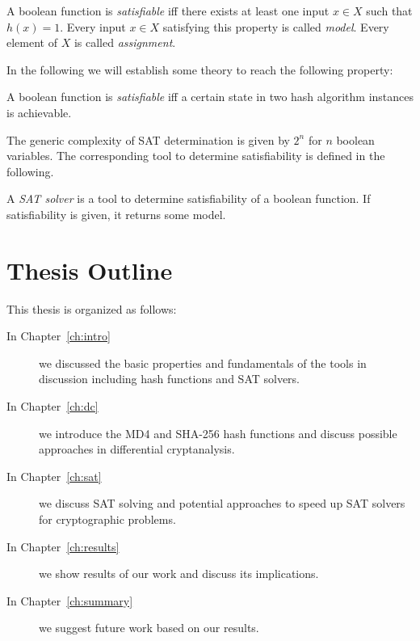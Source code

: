 \begin{defi}
  A boolean function is \emph{satisfiable} iff there exists at least one
  input $x \in X$ such that $h(x) = 1$.
  Every input $x \in X$ satisfying this property is called \emph{model}.
  Every element of $X$ is called \emph{assignment}.
\end{defi}

In the following we will establish some theory to reach
the following property:

\begin{defi}
  A boolean function is \emph{satisfiable} iff a certain state in two hash
  algorithm instances is achievable.
\end{defi}

The generic complexity of SAT determination is given by $2^n$ for $n$ boolean variables.
The corresponding tool to determine satisfiability is defined in the following.

\begin{defi}
  A \emph{SAT solver} is a tool to determine satisfiability of a boolean function.
  If satisfiability is given, it returns some model.
\end{defi}

\section{Thesis Outline}
\label{sec:intro-outline}
%
This thesis is organized as follows:

\begin{description}
\item[In Chapter~\ref{ch:intro}] we discussed the basic properties and fundamentals
of the tools in discussion including hash functions and SAT solvers.

\item[In Chapter~\ref{ch:dc}] we introduce the MD4 and SHA-256 hash functions and
discuss possible approaches in differential cryptanalysis.

\item[In Chapter~\ref{ch:sat}] we discuss SAT solving and potential
approaches to speed up SAT solvers for cryptographic problems.

\item[In Chapter~\ref{ch:results}] we show results of our work
and discuss its implications.

\item[In Chapter~\ref{ch:summary}] we suggest future work based on our results.
\end{description}
